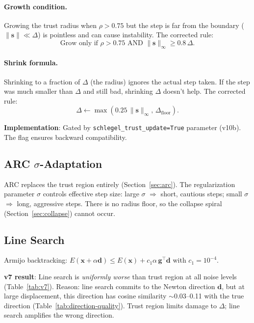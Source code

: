 \documentclass[11pt,a4paper]{article}
\newcommand{\vect}[1]{\bm{#1}}
\newcommand{\norm}[1]{\lVert #1 \rVert}
\theoremstyle{definition}
\begin{document}
\paragraph{Growth condition.}
Growing the trust radius when $\rho > 0.75$ but the step is far from the
boundary ($\norm{\vect{s}} \ll \Delta$) is pointless and can cause
instability.  The corrected rule:
\begin{equation}
  \text{Grow only if } \rho > 0.75 \text{ AND }
  \norm{\vect{s}}_\infty \geq 0.8\,\Delta.
  \label{eq:schlegel-grow}
\end{equation}

\paragraph{Shrink formula.}
Shrinking to a fraction of $\Delta$ (the radius) ignores the actual step
taken.  If the step was much smaller than $\Delta$ and still bad, shrinking
$\Delta$ doesn't help.  The corrected rule:
\begin{equation}
  \Delta \gets \max(0.25\,\norm{\vect{s}}_\infty, \, \Delta_\text{floor}).
  \label{eq:schlegel-shrink}
\end{equation}

\textbf{Implementation}: Gated by \texttt{schlegel\_trust\_update=True}
parameter (v10b).  The flag ensures backward compatibility.

\subsection{ARC $\sigma$-Adaptation}
\label{sec:arc-sigma}

ARC replaces the trust region entirely (Section~\ref{sec:arc}).  The
regularization parameter $\sigma$ controls effective step size: large $\sigma$
$\Rightarrow$ short, cautious steps; small $\sigma$ $\Rightarrow$ long,
aggressive steps.  There is no radius floor, so the collapse spiral
(Section~\ref{sec:collapse}) cannot occur.

\subsection{Line Search}
\label{sec:line-search}

Armijo backtracking: $E(\vect{x}+\alpha\vect{d}) \leq E(\vect{x}) + c_1
\alpha\, \vect{g}^\top\vect{d}$ with $c_1=10^{-4}$.

\textbf{v7 result}: Line search is \emph{uniformly worse} than trust region
at all noise levels (Table~\ref{tab:v7}).  Reason: line search commits to the
Newton direction $\vect{d}$, but at large displacement, this direction has
cosine similarity $\sim$0.03--0.11 with the true direction
(Table~\ref{tab:direction-quality}).  Trust region limits damage to $\Delta$;
line search amplifies the wrong direction.
\end{document}
